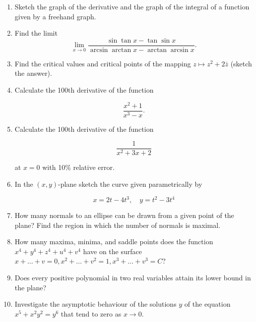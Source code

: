 \documentclass{article}
\begin{document}
\begin{enumerate}
\item Sketch the graph of the derivative and the graph of the integral of a function given by a freehand graph.

\item Find the limit
  \begin{equation*}
    \lim_{x \rightarrow 0} \frac{\sin \tan x - \tan \sin x}{\arcsin \arctan x - \arctan \arcsin x}.
  \end{equation*}

\item Find the critical values and critical points of the mapping $z \mapsto z^2 + 2\bar{z}$ (sketch the answer).

\item Calculate the 100th derivative of the function

  \begin{equation*}
    \frac{x^2+1}{x^3-x}.
  \end{equation*}

\item Calculate the 100th derivative of the function

  \begin{equation*}
    \frac{1}{x^2 + 3x + 2}
  \end{equation*}

  at $x = 0$ with 10\% relative error.

\item In the $(x, y)$-plane sketch the curve given parametrically by

  \begin{equation*}
    x = 2t  - 4t^3, \quad y = t^2 - 3t^4
  \end{equation*}

\item How many normals to an ellipse can be drawn from a given point of the plane? Find the region in which the number of normals is maximal.

\item How many maxima, minima, and saddle points does the function $x^4 + y^4 + z^4 + u^4 + v^4$ have on the surface $x + \dots + v = 0, x^2 + \dots + v^2 = 1, x^3 + \dots + v^3 = C$?

\item Does every positive polynomial in two real variables attain its lower bound in the plane?

\item Investigate the asymptotic behaviour of the solutions $y$ of the equation $x^5 + x^2y^2 = y^6$ that tend to zero as $x \rightarrow 0$.


\end{enumerate}
\end{document}
